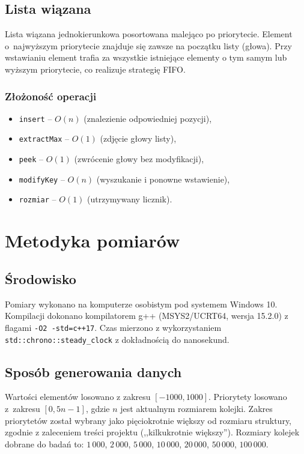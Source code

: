 \subsection{Lista wiązana}

Lista wiązana jednokierunkowa posortowana malejąco po priorytecie. Element
o~najwyższym priorytecie znajduje się zawsze na początku listy (głowa). Przy
wstawianiu element trafia za wszystkie istniejące elementy o tym samym lub
wyższym priorytecie, co realizuje strategię FIFO.

\subsubsection*{Złożoność operacji}
\begin{itemize}
    \item \texttt{insert} -- $O(n)$ (znalezienie odpowiedniej pozycji),
    \item \texttt{extractMax} -- $O(1)$ (zdjęcie głowy listy),
    \item \texttt{peek} -- $O(1)$ (zwrócenie głowy bez modyfikacji),
    \item \texttt{modifyKey} -- $O(n)$ (wyszukanie i ponowne wstawienie),
    \item \texttt{rozmiar} -- $O(1)$ (utrzymywany licznik).
\end{itemize}

\section{Metodyka pomiarów}

\subsection{Środowisko}

Pomiary wykonano na komputerze osobistym pod systemem Windows 10. Kompilacji
dokonano kompilatorem g++ (MSYS2/UCRT64, wersja 15.2.0) z flagami
\texttt{-O2 -std=c++17}. Czas mierzono z wykorzystaniem \texttt{std::chrono::steady\_clock}
z dokładnością do nanosekund.

\subsection{Sposób generowania danych}

Wartości elementów losowano z zakresu $[-1000, 1000]$. Priorytety losowano
z~zakresu $[0, 5n - 1]$, gdzie $n$ jest aktualnym rozmiarem kolejki. Zakres
priorytetów został wybrany jako pięciokrotnie większy od rozmiaru struktury,
zgodnie z zaleceniem treści projektu (,,kilkukrotnie większy''). Rozmiary
kolejek dobrane do badań to: $1\,000$, $2\,000$, $5\,000$, $10\,000$, $20\,000$,
$50\,000$, $100\,000$.

